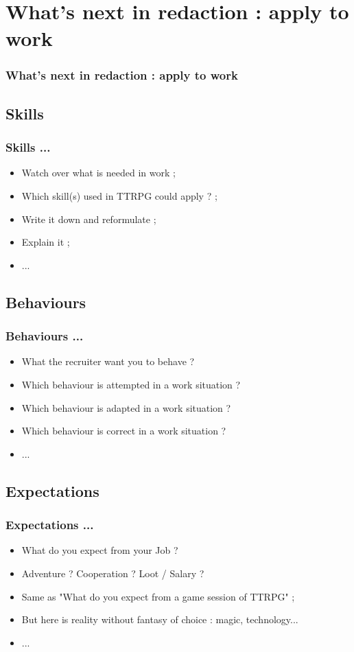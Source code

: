 \documentclass[slidetop,11pt]{beamer}
\begin{document}
\def\sectionIIItitle{What's next in redaction : apply to work}
\section{ \sectionIIItitle }
\begin{frame}
	\frametitle{ \sectionIIItitle }
	\tableofcontents[sections=3,currentsection,subsectionstyle=show/shaded/hide]
\end{frame} 

\subsection{ Skills }
\begin{frame}
	\frametitle{ Skills ... }
	\begin{itemize}
		\item Watch over what is needed in work ; 
		\item Which skill(s) used in TTRPG could apply ? ; 
		\item Write it down and reformulate ; 
		\item Explain it ; 
		\item ... 
	\end{itemize}
\end{frame}

\subsection{ Behaviours }
\begin{frame}
	\frametitle{ Behaviours ... }
	\begin{itemize}
		\item What the recruiter want you to behave ?
		\item Which behaviour is attempted in a work situation ?
		\item Which behaviour is adapted in a work situation ?
		\item Which behaviour is correct in a work situation ?
		\item ... 
	\end{itemize}
\end{frame}

\subsection{ Expectations }
\begin{frame}
	\frametitle{ Expectations ... }
	\begin{itemize}
		\item What do you expect from your Job ?
		\item Adventure ? Cooperation ? Loot / Salary ?
		\item Same as "What do you expect from a game session of TTRPG" ; 
		\item But here is reality without fantasy of choice : magic, technology...
		\item ... 
	\end{itemize}
\end{frame}

\end{document}
